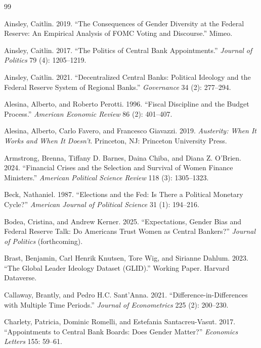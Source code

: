 \documentclass[12pt]{article}
\begin{document}
\begin{thebibliography}{99}

Ainsley, Caitlin. 2019. ``The Consequences of Gender Diversity at 
the Federal Reserve: An Empirical Analysis of FOMC Voting and 
Discourse.'' Mimeo.\

Ainsley, Caitlin. 2017. ``The Politics of Central Bank Appointments.''
\textit{Journal of Politics} 79 (4): 1205--1219.

Ainsley, Caitlin. 2021. ``Decentralized Central Banks: Political
Ideology and the Federal Reserve System of Regional Banks.''
\textit{Governance} 34 (2): 277--294.

Alesina, Alberto, and Roberto Perotti. 1996. ``Fiscal Discipline and
the Budget Process.'' 
\textit{American Economic Review} 86 (2):
401--407.

Alesina, Alberto, Carlo Favero, and Francesco Giavazzi. 2019.
\textit{Austerity: When It Works and When It Doesn't}. Princeton, NJ:
Princeton University Press.

Armstrong, Brenna, Tiffany D. Barnes, Daina Chiba, and Diana Z.
O'Brien. 2024. ``Financial Crises and the Selection and Survival of
Women Finance Ministers.'' 
\textit{American Political Science Review}
118 (3): 1305--1323.

Beck, Nathaniel. 1987. ``Elections and the Fed: Is There a Political
Monetary Cycle?''
\textit{American Journal of Political Science} 31
(1): 194--216.

Bodea, Cristina, and Andrew Kerner. 2025. ``Expectations, Gender Bias
and Federal Reserve Talk: Do Americans Trust Women as Central
Bankers?'' 
\textit{Journal of Politics} (forthcoming).

Brast, Benjamin, Carl Henrik Knutsen, Tore Wig, and Sirianne Dahlum.
2023. ``The Global Leader Ideology Dataset (GLID).'' Working Paper.
Harvard Dataverse.

Callaway, Brantly, and Pedro H.C. Sant'Anna. 2021.
``Difference-in-Differences with Multiple Time Periods.''
\textit{Journal of Econometrics} 225 (2): 200--230.

Charlety, Patricia, Dominic Romelli, and Estefania Santacreu-Vasut.
2017. ``Appointments to Central Bank Boards: Does Gender Matter?''
\textit{Economics Letters} 155: 59--61.


\end{thebibliography}
\end{document}
